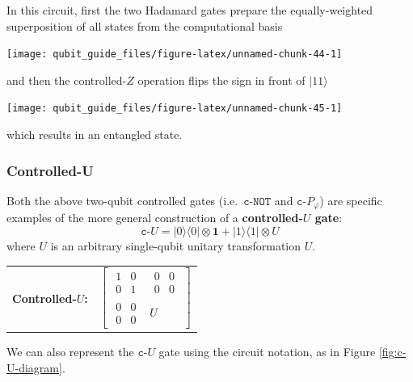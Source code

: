 \documentclass[fleqn,a4paper]{article}
\newenvironment{idea}{\everypar{\setlength{\parindent}{1.5em}}}{}
\theoremstyle{definition}
\theoremstyle{definition}
\theoremstyle{definition}
\theoremstyle{definition}
\theoremstyle{remark}
\begin{document}
In this circuit, first the two Hadamard gates prepare the equally-weighted superposition of all states from the computational basis

\begin{center}\texttt{[image: qubit\_guide\_files/figure-latex/unnamed-chunk-44-1]} \end{center}

and then the controlled-\(Z\) operation flips the sign in front of \(|11\rangle\)

\begin{center}\texttt{[image: qubit\_guide\_files/figure-latex/unnamed-chunk-45-1]} \end{center}

which results in an entangled state.

\hypertarget{controlled-u}{%
\subsubsection{Controlled-U}\label{controlled-u}}

Both the above two-qubit controlled gates (i.e.~\(\texttt{c-NOT}\) and \(\texttt{c-}P_\varphi\)) are specific examples of the more general construction of a \textbf{controlled-\(U\) gate}:
\[
  \texttt{c-}U
  = |0\rangle\langle 0|\otimes\mathbf{1}+ |1\rangle\langle 1|\otimes U
\]
where \(U\) is an arbitrary single-qubit unitary transformation \(U\).

\begin{idea}

\centering
\begin{tabular}{ll}
  \textbf{Controlled-$U$:}
  & $\left[\begin{array}{c|c}\begin{matrix}1&0\\0&1\end{matrix}&\begin{matrix}0&0\\0&0\end{matrix}\\\hline\begin{matrix}0&0\\0&0\end{matrix}&U\end{array}\right]$
\end{tabular}

\end{idea}

We can also represent the \(\texttt{c-}U\) gate using the circuit notation, as in Figure \ref{fig:c-U-diagram}.
\end{document}
